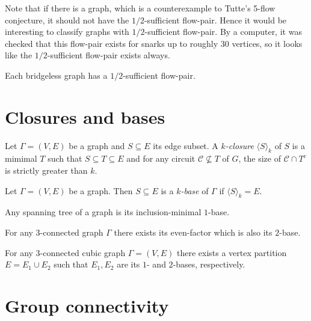 Note that if there is a graph, which is a counterexample to Tutte's 5-flow conjecture, it should not have the $1/2$-sufficient flow-pair. Hence it would be interesting to classify graphs with $1/2$-sufficient flow-pair. By a computer, it was checked that this flow-pair exists for snarks up to roughly $30$ vertices, so it looks like the $1/2$-sufficient flow-pair exists always.

\begin{conjecture} \emph{\cite[p. 346]{svk}}
    Each bridgeless graph has a $1/2$-sufficient flow-pair.
\end{conjecture}


\section{Closures and bases}

\begin{definition} \cite[p. 132]{seymour}
	Let $\Gamma=(V,E)$ be a graph and $S\subseteq E$ its edge subset. A \emph{$k$-closure} $\langle S\rangle_{k}$ of $S$ is a mimimal $T$ such that $S\subseteq T\subseteq E$ and for any circuit $\mathcal C\not\subseteq T$ of $G$, the size of $\mathcal C\cap T^c$ is strictly greater than $k$.
\end{definition}

\begin{definition} \cite[p. 7]{group_connectivity_enumeration}
	Let $\Gamma=(V,E)$ be a graph. Then $S\subseteq E$ is a \emph{$k$-base} of $\Gamma$ if $\langle S\rangle_k = E$.
\end{definition}

\begin{claim}
	Any spanning tree of a graph is its inclusion-minimal $1$-base.
\end{claim}

\begin{lemma} \cite[p. 133]{seymour}
	For any $3$-connected graph $\Gamma$ there exists its even-factor which is also its $2$-base.
\end{lemma}

\begin{lemma} \cite[p. 134]{seymour}
	For any $3$-connected cubic graph $\Gamma=(V,E)$ there exists a vertex partition $E=E_1\cup E_2$ such that $E_1,E_2$ are its $1$- and $2$-bases, respectively.
\end{lemma}

\section{Group connectivity}




